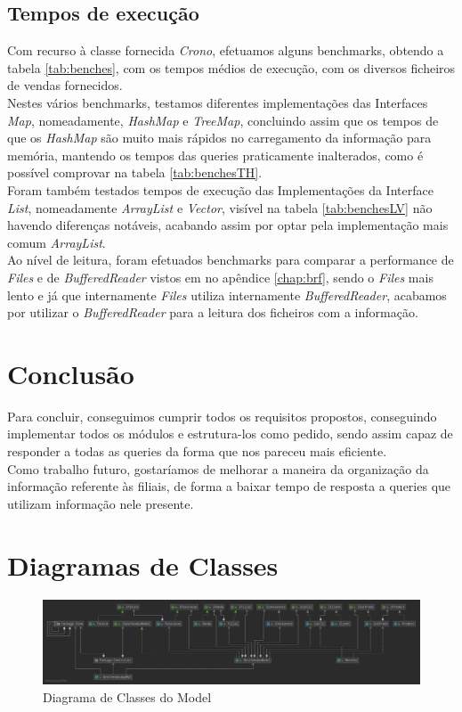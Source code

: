 \documentclass[a4paper]{report}
\begin{document}
\section{Tempos de execução}

Com recurso à classe fornecida \textit{Crono}, efetuamos alguns benchmarks, obtendo
a tabela \ref{tab:benches}, com os tempos médios de execução, com os diversos ficheiros
de vendas fornecidos.\\
Nestes vários benchmarks, testamos diferentes implementações das Interfaces \textit{Map},
nomeadamente, \textit{HashMap} e \textit{TreeMap}, concluindo assim que os tempos de 
que os \textit{HashMap} são muito mais rápidos no carregamento da informação para 
memória, mantendo os tempos das queries praticamente inalterados, como é possível
comprovar na tabela \ref{tab:benchesTH}.\\
Foram também testados tempos de execução das Implementações da Interface \textit{List},
nomeadamente \textit{ArrayList} e \textit{Vector}, visível na tabela \ref{tab:benchesLV}
não havendo diferenças notáveis, acabando assim por optar pela implementação 
mais comum \textit{ArrayList}.\\
Ao nível de leitura, foram efetuados benchmarks para comparar a performance de
\textit{Files} e de \textit{BufferedReader} vistos em no apêndice \ref{chap:brf}, sendo o
\textit{Files} mais lento e já que internamente \textit{Files} utiliza internamente
\textit{BufferedReader}, acabamos por utilizar o \textit{BufferedReader} para a leitura
dos ficheiros com a informação.

\chapter{Conclusão}

Para concluir, conseguimos cumprir todos os requisitos propostos, conseguindo implementar
todos os módulos e estrutura-los como pedido, sendo assim capaz de responder a todas as 
queries da forma que nos pareceu mais eficiente.\\
Como trabalho futuro, gostaríamos de melhorar a maneira da organização da informação 
referente às filiais, de forma a baixar tempo de resposta a queries que utilizam informação
nele presente.

\appendix

\chapter{Diagramas de Classes}
\begin{figure}[H]
    \begin{center}
        \includegraphics[width=1\textwidth]{modelGraph.png}\par
        \caption{Diagrama de Classes do Model}
    \end{center}
\end{figure}
\end{document}
